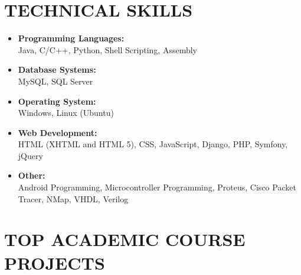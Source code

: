 \documentclass[margin]{res}
\begin{document}
\begin{resume}
\vspace{-3mm}

\section{TECHNICAL SKILLS}
	
\begin{itemize} \itemsep -8pt

\item \textbf{Programming Languages:}\\
Java, C/C++, Python, Shell Scripting, Assembly                                                      \\

\item \textbf{Database Systems:}\\
MySQL, SQL Server                                                                             		\\

\item \textbf{Operating System:}\\
Windows, Linux (Ubuntu)                                                                             \\

\item \textbf{Web Development:}\\
HTML (XHTML and HTML 5), CSS, JavaScript, Django, PHP, Symfony, jQuery                              \\

\item \textbf{Other:}\\
Android Programming, Microcontroller Programming, Proteus, Cisco Packet Tracer, NMap, VHDL, Verilog \\
	
\end{itemize} 


\vspace{-6mm}

\section{TOP ACADEMIC COURSE PROJECTS}


\end{resume}
\end{document}
